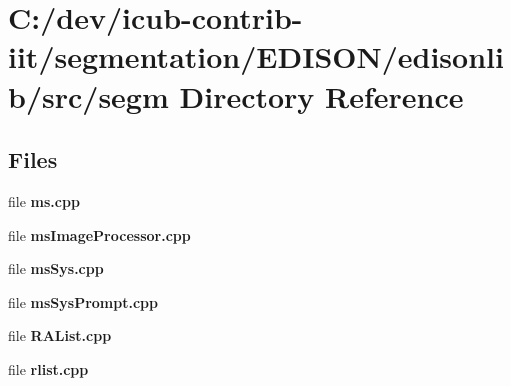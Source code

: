 \section{C\+:/dev/icub-\/contrib-\/iit/segmentation/\+E\+D\+I\+S\+O\+N/edisonlib/src/segm Directory Reference}
\label{dir_eada60fe3d29503381d0e05be82fd90f}
\subsection*{Files}
\begin{DoxyCompactItemize}
\item 
file {\bfseries ms.\+cpp}
\item 
file {\bfseries ms\+Image\+Processor.\+cpp}
\item 
file {\bfseries ms\+Sys.\+cpp}
\item 
file {\bfseries ms\+Sys\+Prompt.\+cpp}
\item 
file {\bfseries R\+A\+List.\+cpp}
\item 
file {\bfseries rlist.\+cpp}
\end{DoxyCompactItemize}

